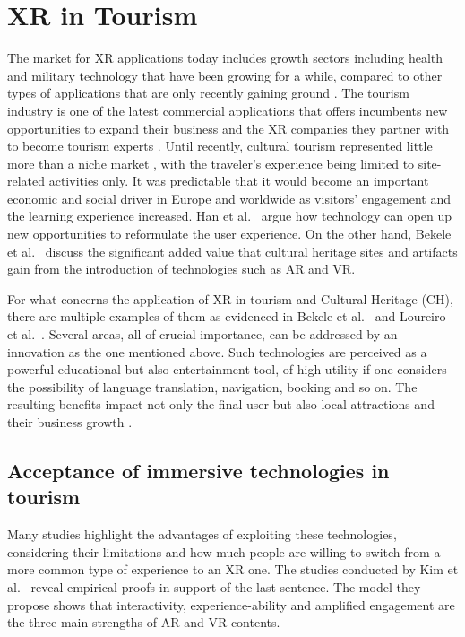 \section{XR in Tourism}
\label{sec:background-tourism-xr}

The market for XR applications today includes growth sectors including health and military technology that have been growing for a while, compared to other types of applications that are only recently gaining ground \cite{honkanen_enhancing_2018}. The tourism industry is one of the latest commercial applications that offers incumbents new opportunities to expand their business and the XR companies they partner with to become tourism experts \cite{kwok_covid-19_2020}.
Until recently, cultural tourism represented little more than a niche market \cite{han_virtual_2019}, with the traveler's experience being limited to site-related activities only. It was predictable that it would become an important economic and social driver in Europe and worldwide as visitors' engagement and the learning experience increased. Han et al.~\cite{han_virtual_2019} argue how technology can open up new opportunities to reformulate the user experience. On the other hand, Bekele et al.~\cite{bekele_survey_2018} discuss the significant added value that cultural heritage sites and artifacts gain from the introduction of technologies such as AR and VR.

For what concerns the application of XR in tourism and Cultural Heritage (CH), there are multiple examples of them as evidenced in Bekele et al.~\cite{bekele_survey_2018} and Loureiro et al.~\cite{loureiro_20_2020}. Several areas, all of crucial importance, can be addressed by an innovation as the one mentioned above. Such technologies are perceived as a powerful educational but also entertainment tool, of high utility if one considers the possibility of language translation, navigation, booking and so on. The resulting benefits impact not only the final user but also local attractions and their business growth \cite{nayyar_virtual_2018}. 

\subsection{Acceptance of immersive technologies in tourism}
Many studies highlight the advantages of exploiting these technologies, considering their limitations and how much people are willing to switch from a more common type of experience to an XR one.
The studies conducted by Kim et al.~\cite{kim_empirical_2020} reveal empirical proofs in support of the last sentence. The model they propose shows that interactivity, experience-ability and amplified engagement are the three main strengths of AR and VR contents.  

